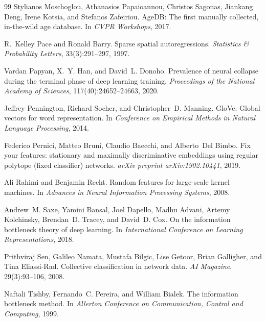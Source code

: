 \documentclass{article} %
\begin{document}
\begin{thebibliography}{99}
Stylianos Moschoglou, Athanasios Papaioannou, Christos Sagonas, Jiankang Deng, Irene
  Kotsia, and Stefanos Zafeiriou.
\newblock AgeDB: The first manually collected, in-the-wild age database.
\newblock In \emph{CVPR Workshops}, 2017.

R.~Kelley Pace and Ronald Barry.
\newblock Sparse spatial autoregressions.
\newblock \emph{Statistics \& Probability Letters}, 33(3):291--297, 1997.

Vardan Papyan, X.~Y. Han, and David~L. Donoho.
\newblock Prevalence of neural collapse during the terminal phase of deep learning
  training.
\newblock \emph{Proceedings of the National Academy of Sciences}, 117(40):24652--24663,
  2020.

Jeffrey Pennington, Richard Socher, and Christopher~D. Manning.
\newblock GloVe: Global vectors for word representation.
\newblock In \emph{Conference on Empirical Methods in Natural Language Processing}, 2014.

Federico Pernici, Matteo Bruni, Claudio Baecchi, and Alberto~Del Bimbo.
\newblock Fix your features: stationary and maximally discriminative embeddings using
  regular polytope (fixed classifier) networks.
\newblock \emph{arXiv preprint arXiv:1902.10441}, 2019.

Ali Rahimi and Benjamin Recht.
\newblock Random features for large-scale kernel machines.
\newblock In \emph{Advances in Neural Information Processing Systems}, 2008.

Andrew~M. Saxe, Yamini Bansal, Joel Dapello, Madhu Advani, Artemy Kolchinsky, Brendan~D.
  Tracey, and David~D. Cox.
\newblock On the information bottleneck theory of deep learning.
\newblock In \emph{International Conference on Learning Representations}, 2018.

Prithviraj Sen, Galileo Namata, Mustafa Bilgic, Lise Getoor, Brian Galligher, and Tina
  Eliassi-Rad.
\newblock Collective classification in network data.
\newblock \emph{AI Magazine}, 29(3):93--106, 2008.

Naftali Tishby, Fernando~C. Pereira, and William Bialek.
\newblock The information bottleneck method.
\newblock In \emph{Allerton Conference on Communication, Control and Computing}, 1999.


\end{thebibliography}
\end{document}
